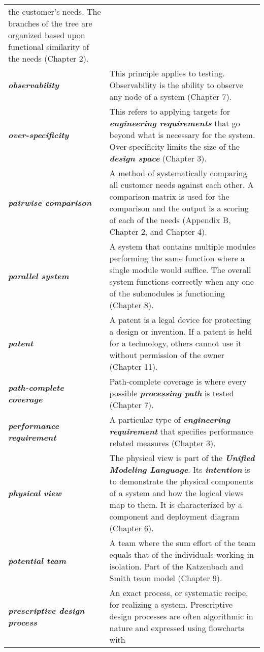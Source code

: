 \begin{longtable} { p{4cm} p{11cm}}
the customer's needs. The branches of the tree are organized based upon
functional similarity of the needs (Chapter 2). \\
\emph{\textbf{observability}} & This principle applies to testing.
Observability is the ability to observe any node of a system (Chapter
7). \\
\emph{\textbf{over-specificity}} & This refers to applying targets for
\emph{\textbf{engineering requirements}} that go beyond what is
necessary for the system. Over-specificity limits the size of the
\emph{\textbf{design space}} (Chapter 3). \\
\emph{\textbf{pairwise comparison}} & A method of systematically
comparing all customer needs against each other. A comparison matrix is
used for the comparison and the output is a scoring of each of the needs
(Appendix B, Chapter 2, and Chapter 4). \\
\emph{\textbf{parallel system}} & A system that contains multiple
modules performing the same function where a single module would
suffice. The overall system functions correctly when any one of the
submodules is functioning (Chapter 8). \\
\emph{\textbf{patent}} & A patent is a legal device for protecting a
design or invention. If a patent is held for a technology, others cannot
use it without permission of the owner (Chapter 11). \\
\emph{\textbf{path-complete coverage}} & Path-complete coverage is where
every possible \emph{\textbf{processing path}} is tested (Chapter 7). \\
\emph{\textbf{performance requirement}} & A particular type of
\emph{\textbf{engineering requirement}} that specifies performance
related measures (Chapter 3). \\
\emph{\textbf{physical view}} & The physical view is part of the
\emph{\textbf{Unified Modeling Language}}. Its \emph{\textbf{intention}}
is to demonstrate the physical components of a system and how the
logical views map to them. It is characterized by a component and
deployment diagram (Chapter 6). \\
\emph{\textbf{potential team}} & A team where the sum effort of the team
equals that of the individuals working in isolation. Part of the
Katzenbach and Smith team model (Chapter 9). \\
\emph{\textbf{prescriptive design process}} & An exact process, or
systematic recipe, for realizing a system. Prescriptive design processes
are often algorithmic in nature and expressed using flowcharts with

\end{longtable}
